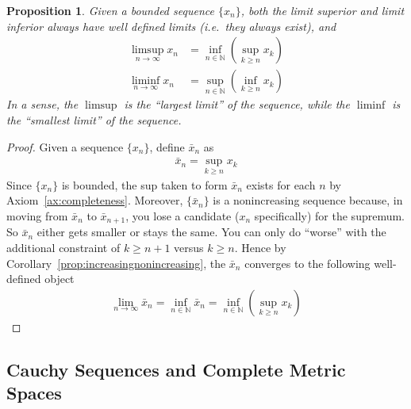 \documentclass[12pt]{book}
\numberwithin{equation}{section} %
\theoremstyle{plain}
\newtheorem{prop}[thm]{Proposition}
\theoremstyle{definition}
\theoremstyle{remark}
\begin{document}
\begin{prop}
Given a bounded sequence $\{x_n\}$,
both the limit superior and limit inferior always have well defined
limits (i.e.\ they always exist), and
\begin{align*}
  \limsup_{n\rightarrow \infty} x_n
  &= \inf_{n\in \mathbb{N}} \left(\sup_{k\geq n} x_k\right)\\
  \liminf_{n\rightarrow \infty} x_n
  &= \sup_{n\in \mathbb{N}} \left(\inf_{k\geq n} x_k\right)
\end{align*}
In a sense, the $\limsup$ is the ``largest limit'' of the sequence,
while the $\liminf$ is the ``smallest limit'' of the sequence.
\end{prop}
\begin{proof}
Given a sequence $\{x_n\}$, define $\bar{x}_n$ as
\begin{align*}
  \bar{x}_n = \sup_{k\geq n} x_k
\end{align*}
Since $\{x_n\}$ is bounded, the sup taken to form $\bar{x}_n$ exists for
each $n$ by Axiom~\ref{ax:completeness}. Moreover, $\{\bar{x}_n\}$ is a
nonincreasing sequence because, in moving from $\bar{x}_n$ to
$\bar{x}_{n+1}$, you lose a candidate ($x_n$ specifically) for the
supremum. So $\bar{x}_n$ either gets smaller or stays the same. You can
only do ``worse'' with the additional constraint of $k\geq n+1$ versus
$k\geq n$. Hence by Corollary~\ref{prop:increasingnonincreasing}, the
$\bar{x}_n$ converges to the following well-defined object
\begin{align*}
  \lim_{n\rightarrow \infty}\bar{x}_n
  = \inf_{n\in \mathbb{N}} \bar{x}_n
  = \inf_{n\in \mathbb{N}} \left( \sup_{k\geq n} x_k\right)
\end{align*}
\end{proof}




\clearpage
\subsection{Cauchy Sequences and Complete Metric Spaces}
\end{document}
